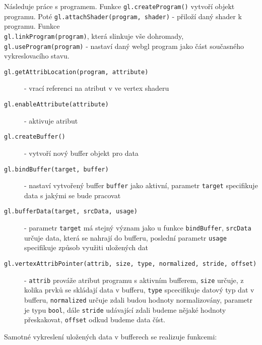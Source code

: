 Následuje práce s programem. Funkce \texttt{gl.createProgram()} vytvoří objekt programu. Poté \texttt{gl.attachShader(program, shader)} - přiloží daný shader k programu.
Funkce \\ \texttt{gl.linkProgram(program)}, která slinkuje vše dohromady, \texttt{gl.useProgram(program)} - nastaví daný webgl program jako část současného vykreslovacího stavu.

\begin{description}
	
	\item[\texttt{gl.getAttribLocation(program, attribute)}] - vrací referenci na atribut v ve vertex shaderu
	
	\item[\texttt{gl.enableAttribute(attribute)}] - aktivuje atribut 
	
	\item[\texttt{gl.createBuffer()}] - vytvoří nový buffer objekt pro data
	
	\item[\texttt{gl.bindBuffer(target, buffer)}] - nastaví vytvořený buffer \texttt{buffer} jako aktivní, parametr \texttt{target} specifikuje data s jakými se bude pracovat
	
	\item[\texttt{gl.bufferData(target, srcData, usage)}] - parametr \texttt{target} má stejný význam jako u funkce \texttt{bindBuffer}, \texttt{srcData} určuje data, která se nahrají do bufferu, poslední parametr \texttt{usage} specifikuje způsob využiti uložených dat
	
	\item[\texttt{gl.vertexAttribPointer(attrib, size, type, normalized, stride, offset)}] -  \texttt{attrib} prováže atribut programu s aktivním bufferem, \texttt{size} určuje, z kolika prvků se skládají data v bufferu, \texttt{type} spcecifikuje datový typ dat v bufferu, \texttt{normalized} určuje zdali budou hodnoty normalizovány, parametr je typu \texttt{bool}, dále \texttt{stride} udávající zdali budeme nějaké hodnoty přeskakovat, \texttt{offset} odkud budeme data číst.
	
	
\end{description}

Samotné vykreslení uložených data v bufferech se realizuje funkcemi:


